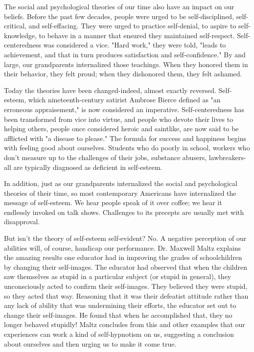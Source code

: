 \documentclass{book}
\begin{document}
The social and psychological theories of our time also have an impact on our beliefs. Before the past few decades, people were urged to be self-disciplined, self-critical, and self-effacing. They were urged to practice self-denial, to aspire to self-knowledge, to behave in a manner that ensured they maintained self-respect. Self-centeredness was considered a vice. "Hard work," they were told, "leads to achievement, and that in turn produces satisfaction and self-confidence." By and large, our grandparents internalized those teachings. When they honored them in their behavior, they felt proud; when they dishonored them, they felt ashamed.

Today the theories have been changed-indeed, almost exactly reversed. Self-esteem, which nineteenth-century satirist Ambrose Bierce defined as "an erroneous appraisement," is now considered an imperative. Self-centeredness has been transformed from vice into virtue, and people who devote their lives to helping others, people once considered heroic and saintlike, are now said to be afflicted with "a disease to please." The formula for success and happiness begins with feeling good about ourselves. Students who do poorly in school, workers who don’t measure up to the challenges of their jobs, substance abusers, lawbreakers-all are typically diagnosed as deficient in self-esteem.

In addition, just as our grandparents internalized the social and psychological theories of their time, so most contemporary Americans have internalized the message of self-esteem. We hear people speak of it over coffee; we hear it endlessly invoked on talk shows. Challenges to its precepts are usually met with disapproval.

But isn’t the theory of self-esteem self-evident? No. A negative perception of our abilities will, of course, handicap our performance. Dr. Maxwell Maltz explains the amazing results one educator had in improving the grades of schoolchildren by changing their self-images. The educator had observed that when the children saw themselves as stupid in a particular subject (or stupid in general), they unconsciously acted to confirm their self-images. They believed they were stupid, so they acted that way. Reasoning that it was their defeatist attitude rather than any lack of ability that was undermining their efforts, the educator set out to change their self-images. He found that when he accomplished that, they no longer behaved stupidly! Maltz concludes from this and other examples that our experiences can work a kind of self-hypnotism on us, suggesting a conclusion about ourselves and then urging us to make it come true.
\end{document}
